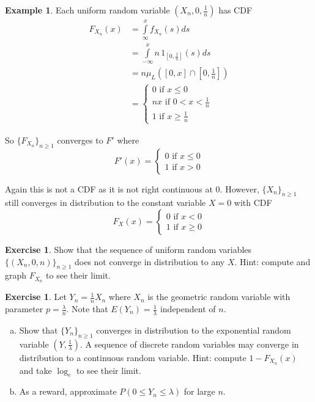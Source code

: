 \documentclass[12pt]{amsart}
\theoremstyle{definition}
\newtheorem{example}[theorem]{Example}
\newtheorem{exercise}[theorem]{Exercise}
\begin{document}
\begin{example} \label{convergence_in_distribution_2} Each uniform random variable $(X_n, 0,\frac{1}{n})$ has CDF
\begin{align*}
F_{X_n}(x) & = \int\limits_{\infty}^x f_{X_n}(s)ds \\
 & = \int\limits_{-\infty}^x n \, 1_{[0,\frac{1}{n}]}(s) ds \\
 & = n \mu_L([0,x] \cap [0, \frac{1}{n}]) \\
 & = \begin{cases} 0 \text{ if } x \leq 0 \\ nx \text{ if } 0 < x < \frac{1}{n} \\ 1 \text{ if } x \geq \frac{1}{n} \end{cases}
\end{align*}

So $\{F_{X_n}\}_{n \geq 1}$ converges to $F'$ where
$$F'(x) = \begin{cases} 0 \text{ if } x \leq 0 \\ 1 \text{ if } x > 0\end{cases}$$

Again this is not a CDF as it is not right continuous at 0. However, $\{X_n\}_{n \geq 1}$ still converges in distribution to the constant variable $X = 0$ with CDF
$$F_X(x) = \begin{cases} 0 \text{ if } x < 0 \\ 1 \text{ if } x \geq 0\end{cases}$$
\end{example}

\begin{exercise} \label{convergence_in_distribution_3} Show that the sequence of uniform random variables $\{(X_n, 0, n)\}_{n \geq 1}$ does not converge in distribution to any $X$. Hint: compute and graph $F_{X_n}$ to see their limit.
\end{exercise}

\begin{exercise} \label{convergence_in_distribution_4} Let $Y_n = \frac{1}{n}X_n$ where $X_n$ is the geometric random variable with parameter $p = \frac{\lambda}{n}$. Note that $E(Y_n) = \frac{1}{\lambda}$ independent of $n$.
\begin{enumerate}[a.]
\item Show that $\{Y_n\}_{n \geq 1}$ converges in distribution to the exponential random variable $(Y, \frac{1}{\lambda})$. A sequence of discrete random variables may converge in distribution to a continuous random variable. Hint: compute $1 - F_{X_n}(x)$ and take $\log_e$ to see their limit.
\item As a reward, approximate $P(0 \leq Y_n \leq \lambda)$ for large $n$.
\end{enumerate}
\end{exercise}
\end{document}
